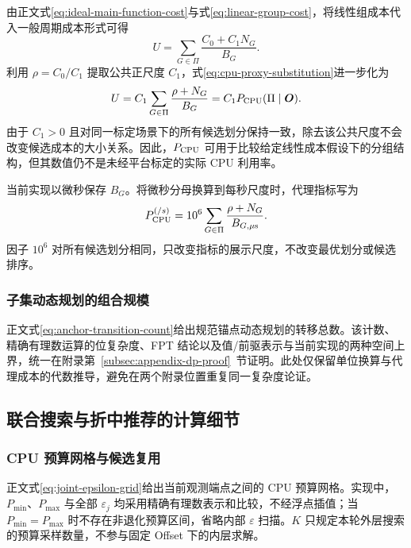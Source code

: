 \documentclass[UTF8,a4paper,twoside,zihao=-4]{ctexart}
\numberwithin{equation}{section}
\numberwithin{figure}{section}
\numberwithin{table}{section}
\theoremstyle{definition}
\numberwithin{algocf}{section}
\begin{document}
由正文式\eqref{eq:ideal-main-function-cost}与式\eqref{eq:linear-group-cost}，将线性组成本代入一般周期成本形式可得
\begin{equation}
 U
 =
 \sum_{G\in\Pi}
 \frac{C_0+C_1N_G}{B_G}.
\label{eq:cpu-proxy-substitution}
\end{equation}
利用 $\rho=C_0/C_1$ 提取公共正尺度 $C_1$，式\eqref{eq:cpu-proxy-substitution}进一步化为
\begin{equation}
 U
 =
 C_1
 \sum_{G\in\Pi}
 \frac{\rho+N_G}{B_G}
 =
 C_1P_{\rm CPU}(\Pi\mid\boldsymbol O).
\label{eq:cpu-proxy-scale-derivation}
\end{equation}
由于 $C_1>0$ 且对同一标定场景下的所有候选划分保持一致，除去该公共尺度不会改变候选成本的大小关系。因此，$P_{\rm CPU}$ 可用于比较给定线性成本假设下的分组结构，但其数值仍不是未经平台标定的实际 CPU 利用率。

当前实现以微秒保存 $B_G$。将微秒分母换算到每秒尺度时，代理指标写为
\begin{equation}
 P_{\rm CPU}^{(/s)}
 =
 10^6
 \sum_{G\in\Pi}
 \frac{\rho+N_G}{B_{G,\mu\mathrm{s}}}.
\label{eq:cpu-proxy-per-second}
\end{equation}
因子 $10^6$ 对所有候选划分相同，只改变指标的展示尺度，不改变最优划分或候选排序。

\subsubsection{子集动态规划的组合规模}

正文式\eqref{eq:anchor-transition-count}给出规范锚点动态规划的转移总数。该计数、精确有理数运算的位复杂度、FPT 结论以及值/前驱表示与当前实现的两种空间上界，统一在附录第~\ref{subsec:appendix-dp-proof}~节证明。此处仅保留单位换算与代理成本的代数推导，避免在两个附录位置重复同一复杂度论证。

\subsection{联合搜索与折中推荐的计算细节}
\label{subsec:appendix-joint-deterministic-details}

\subsubsection{CPU 预算网格与候选复用}
\label{subsubsec:appendix-joint-budget}

正文式\eqref{eq:joint-epsilon-grid}给出当前观测端点之间的 CPU 预算网格。实现中，$P_{\min}$、$P_{\max}$ 与全部 $\varepsilon_j$ 均采用精确有理数表示和比较，不经浮点插值；当 $P_{\min}=P_{\max}$ 时不存在非退化预算区间，省略内部 $\varepsilon$ 扫描。$K$ 只规定本轮外层搜索的预算采样数量，不参与固定 Offset 下的内层求解。
\end{document}
